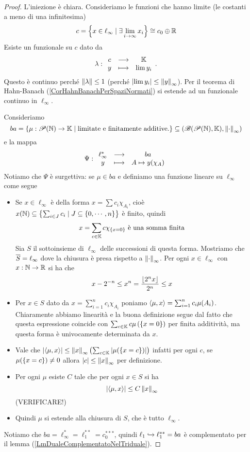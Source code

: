 \begin{proof}
L'iniezione \`e chiara. Consideriamo le funzioni che hanno limite (le costanti a meno di una infinitesima)
\[c=\left\{{x\in\ell_\infty\mid \exists \lim_{i\to\infty}x_i}\right\}\cong c_0\oplus \mathbb{R}\]
Esiste un funzionale su $c$ dato da
\[\lambda:\begin{array}{ccc} {c} & \longrightarrow & {\mathbb{K}}\\ {y} & \longmapsto & {\lim y_i} \end{array}.\]
Questo \`e continuo perch\'e $\left\Vert{\lambda}\right\Vert\leq 1$ (perch\'e $\left|{\lim y_i}\right|\leq \left\Vert{y}\right\Vert_\infty$). Per il teorema di Hahn-Banach (\ref{CorHahnBanachPerSpaziNormati}) si estende ad un funzionale continuo in $\ell_\infty$.

Consideriamo
\[ba=\left\{{\mu:\mathscr{P}(\mathbb{N})\to\mathbb{K}\mid \text{limitate e finitamente additive.}}\right\}\subseteq (\mathscr{B}(\mathscr{P}(\mathbb{N}),\mathbb{K}),{\left\Vert{\cdot}\right\Vert}_\infty)\]
e la mappa
\[\Psi:\begin{array}{ccc} {\ell_\infty^\ast} & \longrightarrow & {ba}\\ {y} & \longmapsto & {A\mapsto y(\chi_A)} \end{array}\]
Notiamo che $\Psi$ \`e surgettiva: se $\mu\in ba$ e definiamo una funzione lineare su $\ell_\infty$ come segue
\begin{itemize}
    \item Se $x\in\ell_\infty$ \`e della forma $x=\sum c_i\chi_{A_i}$, cio\`e $x(\mathbb{N})\subseteq \left\{{\sum_{i\in J}c_i\mid J\subseteq \left\{{0,\cdots, n}\right\}}\right\}$ \`e finito, quindi
    \[x=\sum_{c\in\mathbb{K}}c\chi_{\left\{{x=0}\right\}}\text{ \`e una somma finita}\]
    Sia $S$ il sottoinsieme di $\ell_\infty$ delle successioni di questa forma.
    Mostriamo che $\overline{S}=\ell_\infty$ dove la chiusura \`e presa rispetto a ${\left\Vert{\cdot}\right\Vert}_\infty$. Per ogni $x\in \ell_\infty$ con $x:\mathbb{N}\to\mathbb{R}$ si ha che
    \[x-2^{-n}\leq x^n=\frac{\left\lfloor {2^n x}\right\rfloor}{2^n}\leq x\]
    \item Per $x\in S$ dato da $x=\sum_{i=1}^n c_i\chi_{A_i}$ poniamo $\left\langle {\mu,x}\right\rangle=\sum_{i=1}^n c_i\mu(A_i)$. Chiaramente abbiamo linearit\`a e la buona definizione segue dal fatto che questa espressione coincide con $\sum_{c\in\mathbb{K}}c\mu\left({\left\{{x=0}\right\}}\right)$ per finita additivit\`a, ma questa forma \`e univocamente determinata da $x$.
    \item Vale che $\left|{\left\langle {\mu,x}\right\rangle}\right|\leq \left\Vert{x}\right\Vert_\infty\left({\sum_{c\in \mathbb{K}} \left|{\mu(\left\{{x=c}\right\})}\right|}\right)$ infatti per ogni $c$, se $\mu(\left\{{x=c}\right\})\neq 0$ allora $\left|{c}\right|\leq \left\Vert{x}\right\Vert_\infty$ per definizione.
    \item Per ogni $\mu$ esiste $C$ tale che per ogni $x\in S$ si ha 
    \[\left|{\left\langle {\mu,x}\right\rangle}\right|\leq C\left\Vert{x}\right\Vert_\infty\]
    (VERIFICARE!)
    \item Quindi $\mu$ si estende alla chiusura di $S$, che \`e tutto $\ell_\infty$. 
\end{itemize}
Notiamo che $ba=\ell_\infty^\ast=\ell_1^{\ast\ast}=c_0^{\ast\ast\ast}$, quindi $\ell_1\hookrightarrow \ell_1^{\ast\ast}=ba$ \`e complementato per il lemma (\ref{LmDualeComplementatoNelTriduale}).
\end{proof}



